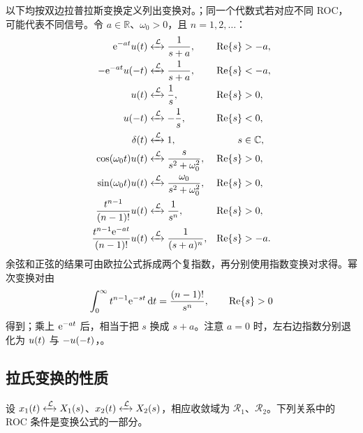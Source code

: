 以下均按双边拉普拉斯变换定义列出变换对。；同一个代数式若对应不同 ROC，可能代表不同信号。令 $a\in\mathbb{R}$、$\omega_0>0$，且 $n=1,2,\ldots$：
\begin{align}
  \mathrm{e}^{-at}u(t)
    &\mathrel{\xleftrightarrow{\,\mathcal{L}\,}} \frac{1}{s+a},
    &\operatorname{Re}\{s\}&>-a,
    \label{eq:laplace-pair-right-exponential}\\
  -\mathrm{e}^{-at}u(-t)
    &\mathrel{\xleftrightarrow{\,\mathcal{L}\,}} \frac{1}{s+a},
    &\operatorname{Re}\{s\}&<-a,
    \label{eq:laplace-pair-left-exponential}\\
  u(t)
    &\mathrel{\xleftrightarrow{\,\mathcal{L}\,}} \frac{1}{s},
    &\operatorname{Re}\{s\}&>0,
    \label{eq:laplace-pair-right-step}\\
  u(-t)
    &\mathrel{\xleftrightarrow{\,\mathcal{L}\,}} -\frac{1}{s},
    &\operatorname{Re}\{s\}&<0,
    \label{eq:laplace-pair-left-step}\\
  \delta(t)
    &\mathrel{\xleftrightarrow{\,\mathcal{L}\,}} 1,
    &s&\in\mathbb{C},
    \label{eq:laplace-pair-impulse}\\
  \cos(\omega_0t)u(t)
    &\mathrel{\xleftrightarrow{\,\mathcal{L}\,}} \frac{s}{s^2+\omega_0^2},
    &\operatorname{Re}\{s\}&>0,
    \label{eq:laplace-pair-cosine}\\
  \sin(\omega_0t)u(t)
    &\mathrel{\xleftrightarrow{\,\mathcal{L}\,}} \frac{\omega_0}{s^2+\omega_0^2},
    &\operatorname{Re}\{s\}&>0,
    \label{eq:laplace-pair-sine}\\
  \frac{t^{n-1}}{(n-1)!}u(t)
    &\mathrel{\xleftrightarrow{\,\mathcal{L}\,}} \frac{1}{s^n},
    &\operatorname{Re}\{s\}&>0,
    \label{eq:laplace-pair-power}\\
  \frac{t^{n-1}\mathrm{e}^{-at}}{(n-1)!}u(t)
    &\mathrel{\xleftrightarrow{\,\mathcal{L}\,}} \frac{1}{(s+a)^n},
    &\operatorname{Re}\{s\}&>-a.
    \label{eq:laplace-pair-damped-power}
\end{align}
余弦和正弦的结果可由欧拉公式拆成两个复指数，再分别使用指数变换对求得。幂次变换对由
\[
  \int_0^\infty t^{n-1}\mathrm{e}^{-st}\mathop{}\!\mathrm{d} t=\frac{(n-1)!}{s^n},
  \qquad \operatorname{Re}\{s\}>0
\]
得到；乘上 $\mathrm{e}^{-at}$ 后，相当于把 $s$ 换成 $s+a$。注意 $a=0$ 时，左右边指数分别退化为 $u(t)$ 与 $-u(-t)$，。

\subsection{拉氏变换的性质}
\label{subsec:laplace-properties}

设 $x_1(t)\mathrel{\xleftrightarrow{\,\mathcal{L}\,}} X_1(s)$、$x_2(t)\mathrel{\xleftrightarrow{\,\mathcal{L}\,}} X_2(s)$，相应收敛域为 $\mathcal R_1$、$\mathcal R_2$。下列关系中的 ROC 条件是变换公式的一部分。

